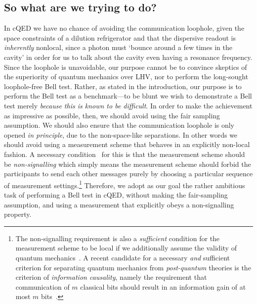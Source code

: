 \subsection{So what are we trying to do?}\label{sec:sowhat}
In cQED we have no chance of avoiding the communication loophole, given the space constraints of a dilution refrigerator and that the dispersive readout is \emph{inherently} nonlocal, since a photon must `bounce around a few times in the cavity' in order for us to talk about the cavity even having a resonance frequency. Since the loophole is unavoidable, our purpose cannot be to convince skeptics of the superiority of quantum mechanics over LHV, nor to perform the long-sought loophole-free Bell test. Rather, as stated in the introduction, our purpose is to perform the Bell test as a benchmark---to be blunt we wish to demonstrate a Bell test merely \emph{because this is known to be difficult}. In order to make the achievement as impressive as possible, then, we should avoid using the fair sampling assumption. We should also ensure that the communication loophole is only opened \emph{in principle}, due to the non-space-like separations. In other words we should avoid using a measurement scheme that behaves in an explicitly non-local fashion. A necessary condition~\cite{popescu_1994} for this is that the measurement scheme should be \emph{non-signalling} which simply means the  measurement scheme should forbid the participants to send each other messages purely by choosing a particular sequence of measurement settings.\footnote{The non-signalling requirement is also a \emph{sufficient} condition for the measurement scheme to be local if we additionally assume the validity of quantum mechanics~\cite{dieks_inequalities_2002}. A recent candidate for a necessary \emph{and} sufficient criterion for separating quantum mechanics from \emph{post-quantum} theories is the criterion of \emph{information causality}, namely the requirement that communication of $m$ classical bits should result in an information gain of at most $m$ bits~\cite{pawlowski_new_2009}.} Therefore, we adopt as our goal the rather ambitious task of performing a Bell test in cQED, without making the fair-sampling assumption, and using a measurement that explicitly obeys a non-signalling property.

